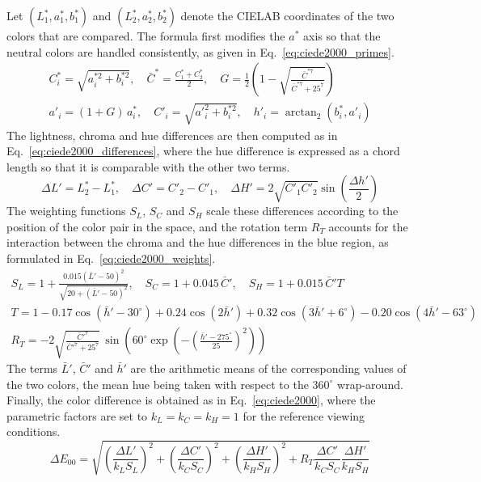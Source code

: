 Let $(L^*_1, a^*_1, b^*_1)$ and $(L^*_2, a^*_2, b^*_2)$ denote the CIELAB coordinates of the two colors that are compared. The formula first modifies the $a^*$ axis so that the neutral colors are handled consistently, as given in Eq.~\ref{eq:ciede2000_primes}.
\begin{equation}
    \begin{gathered}
        C^*_i = \sqrt{a^{*2}_i + b^{*2}_i}, \quad \bar{C}^* = \frac{C^*_1 + C^*_2}{2}, \quad
        G = \frac{1}{2}\left(1 - \sqrt{\frac{\bar{C}^{*7}}{\bar{C}^{*7} + 25^7}}\right) \\
        a'_i = (1 + G)\,a^*_i, \quad C'_i = \sqrt{a'^2_i + b^{*2}_i}, \quad h'_i = \arctan_2\left(b^*_i, a'_i\right)
    \end{gathered}
    \label{eq:ciede2000_primes}
\end{equation}
The lightness, chroma and hue differences are then computed as in Eq.~\ref{eq:ciede2000_differences}, where the hue difference is expressed as a chord length so that it is comparable with the other two terms.
\begin{equation}
    \Delta L' = L^*_2 - L^*_1, \quad
    \Delta C' = C'_2 - C'_1, \quad
    \Delta H' = 2\sqrt{C'_1 C'_2}\sin\left(\frac{\Delta h'}{2}\right)
    \label{eq:ciede2000_differences}
\end{equation}
The weighting functions $S_L$, $S_C$ and $S_H$ scale these differences according to the position of the color pair in the space, and the rotation term $R_T$ accounts for the interaction between the chroma and the hue differences in the blue region, as formulated in Eq.~\ref{eq:ciede2000_weights}.
\begin{equation}
    \begin{gathered}
        S_L = 1 + \frac{0.015\left(\bar{L}' - 50\right)^2}{\sqrt{20 + \left(\bar{L}' - 50\right)^2}}, \quad
        S_C = 1 + 0.045\,\bar{C}', \quad
        S_H = 1 + 0.015\,\bar{C}'T \\
        T = 1 - 0.17\cos\left(\bar{h}' - 30^\circ\right) + 0.24\cos\left(2\bar{h}'\right) + 0.32\cos\left(3\bar{h}' + 6^\circ\right) - 0.20\cos\left(4\bar{h}' - 63^\circ\right) \\
        R_T = -2\sqrt{\frac{\bar{C}'^7}{\bar{C}'^7 + 25^7}}\,\sin\left(60^\circ\exp\left(-\left(\frac{\bar{h}' - 275^\circ}{25}\right)^2\right)\right)
    \end{gathered}
    \label{eq:ciede2000_weights}
\end{equation}
The terms $\bar{L}'$, $\bar{C}'$ and $\bar{h}'$ are the arithmetic means of the corresponding values of the two colors, the mean hue being taken with respect to the $360^\circ$ wrap-around. Finally, the color difference is obtained as in Eq.~\ref{eq:ciede2000}, where the parametric factors are set to $k_L = k_C = k_H = 1$ for the reference viewing conditions.
\begin{equation}
    \Delta E_{00} = \sqrt{\left(\frac{\Delta L'}{k_L S_L}\right)^2 + \left(\frac{\Delta C'}{k_C S_C}\right)^2 + \left(\frac{\Delta H'}{k_H S_H}\right)^2 + R_T\frac{\Delta C'}{k_C S_C}\frac{\Delta H'}{k_H S_H}}
    \label{eq:ciede2000}
\end{equation}


